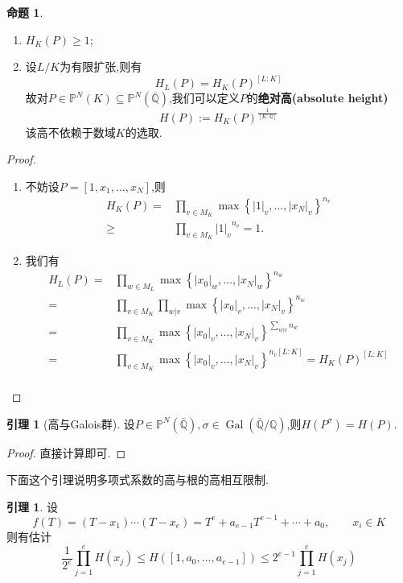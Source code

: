 \documentclass[12pt,A4paper,oneside,reqno]{amsart}
\numberwithin{equation}{section}
\theoremstyle{definition}
\newtheorem{lemma}[theorem]{引理}
\newtheorem{proposition}[theorem]{命题}
\theoremstyle{plain}
\theoremstyle{plain}
\numberwithin{equation}{section}
\theoremstyle{remark}
\newcommand{\Gal}{\operatorname{Gal}}
\begin{document}
\begin{proposition}\
	\begin{enumerate}[1.]
		\item $H_K(P) \geqslant 1$;
		\item 设$L/K$为有限扩张,则有
		$$H_L(P)=H_K(P)^{[L:K]}$$
		故对$P \in \mathbb{P}^N(K) \subseteq \mathbb{P}^N(\bar{\mathbb{Q}})$,我们可以定义$P$的\textbf{绝对高(absolute height)}
		$$H(P):=H_K(P)^{\frac{1}{[K:\mathbb{Q}]}}$$
		该高不依赖于数域$K$的选取.
	\end{enumerate}
\end{proposition}
\begin{proof}\
		\begin{enumerate}[1.]
		\item 不妨设$P=[1,x_1,\ldots,x_N]$,则
		\begin{equation*}
		\begin{aligned}
		H_K(P)=&\prod_{v \in M_K} \max \left\{|1|_v, \ldots , |x_N|_v \right\}^{n_v}\\
		\geqslant & \prod_{v \in M_K}{|1|_v}^{n_v}=1.
		\end{aligned}
		\end{equation*}
		\item 我们有
		\begin{equation*}
		\begin{aligned}
		H_L(P)=&\prod_{w \in M_L} \max \left\{|x_0|_w, \ldots , |x_N|_w \right\}^{n_w}\\
		=&\prod_{v \in M_K}\prod_{w|v} \max \left\{|x_0|_v, \ldots , |x_N|_v \right\}^{n_w}\\
		=&\prod_{v \in M_K} \max \left\{|x_0|_v, \ldots , |x_N|_v \right\}^{\sum_{w | v}n_w}\\
		=&\prod_{v \in M_K} \max \left\{|x_0|_v, \ldots , |x_N|_v \right\}^{n_v[L:K]}=H_K(P)^{[L:K]}\\
		\end{aligned}
		\end{equation*}
	\end{enumerate}
\end{proof}
\begin{lemma}[高与Galois群]\label{lem:Gal&hei}
	设$P \in \mathbb{P}^N(\bar{\mathbb{Q}}), \sigma \in \Gal(\bar{\mathbb{Q}}/\mathbb{Q})$,则$H(P^{\sigma})=H(P)$.
\end{lemma}
\begin{proof}
	直接计算即可.
\end{proof}
下面这个引理说明多项式系数的高与根的高相互限制.
\begin{lemma}\label{lem:poly&hei}
	设
	$$f(T)=(T-x_1) \cdots (T-x_e)=T^e+a_{e-1}T^{e-1}+\cdots +a_0, \qquad x_i \in K$$
	则有估计
	$$\frac{1}{2^e} \prod_{j=1}^{e}H(x_j) \leqslant H([1,a_0, \ldots ,a_{e-1}]) \leqslant 2^{e-1} \prod_{j=1}^{e}H(x_j)$$
\end{lemma}
\end{document}

